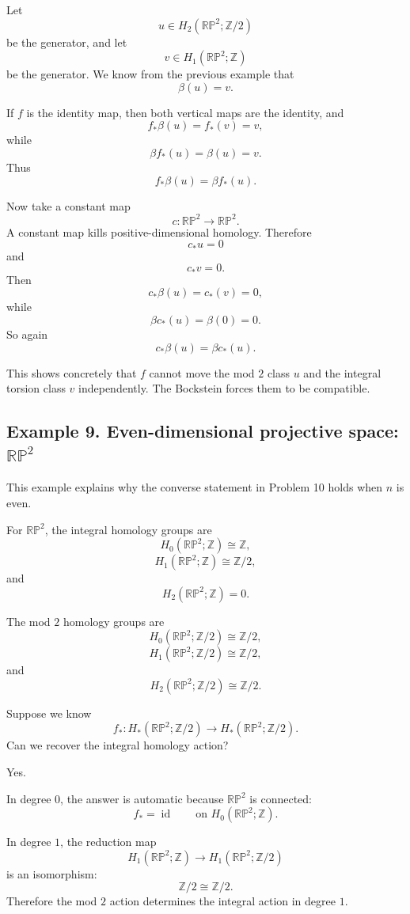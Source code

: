 \documentclass[12pt,a4paper]{article}
\theoremstyle{notespace}
\begin{document}
Let
\[
u\in H_2(\mathbb{RP}^2;\mathbb Z/2)
\]
be the generator, and let
\[
v\in H_1(\mathbb{RP}^2;\mathbb Z)
\]
be the generator. We know from the previous example that
\[
\beta(u)=v.
\]

If \(f\) is the identity map, then both vertical maps are the identity, and
\[
f_*\beta(u)=f_*(v)=v,
\]
while
\[
\beta f_*(u)=\beta(u)=v.
\]
Thus
\[
f_*\beta(u)=\beta f_*(u).
\]

Now take a constant map
\[
c:\mathbb{RP}^2\longrightarrow \mathbb{RP}^2.
\]
A constant map kills positive-dimensional homology. Therefore
\[
c_*u=0
\]
and
\[
c_*v=0.
\]
Then
\[
c_*\beta(u)=c_*(v)=0,
\]
while
\[
\beta c_*(u)=\beta(0)=0.
\]
So again
\[
c_*\beta(u)=\beta c_*(u).
\]

This shows concretely that \(f\) cannot move the mod \(2\) class \(u\) and the integral torsion class \(v\) independently. The Bockstein forces them to be compatible.

\subsection{Example 9. Even-dimensional projective space: \texorpdfstring{\(\mathbb{RP}^2\)}{RP2}}

This example explains why the converse statement in Problem 10 holds when \(n\) is even.

For \(\mathbb{RP}^2\), the integral homology groups are
\[
H_0(\mathbb{RP}^2;\mathbb Z)\cong\mathbb Z,
\]
\[
H_1(\mathbb{RP}^2;\mathbb Z)\cong\mathbb Z/2,
\]
and
\[
H_2(\mathbb{RP}^2;\mathbb Z)=0.
\]

The mod \(2\) homology groups are
\[
H_0(\mathbb{RP}^2;\mathbb Z/2)\cong\mathbb Z/2,
\]
\[
H_1(\mathbb{RP}^2;\mathbb Z/2)\cong\mathbb Z/2,
\]
and
\[
H_2(\mathbb{RP}^2;\mathbb Z/2)\cong\mathbb Z/2.
\]

Suppose we know
\[
f_*:H_*(\mathbb{RP}^2;\mathbb Z/2)
\longrightarrow
H_*(\mathbb{RP}^2;\mathbb Z/2).
\]
Can we recover the integral homology action?

Yes.

In degree \(0\), the answer is automatic because \(\mathbb{RP}^2\) is connected:
\[
f_*=\operatorname{id}
\qquad
\text{on }
H_0(\mathbb{RP}^2;\mathbb Z).
\]

In degree \(1\), the reduction map
\[
H_1(\mathbb{RP}^2;\mathbb Z)
\longrightarrow
H_1(\mathbb{RP}^2;\mathbb Z/2)
\]
is an isomorphism:
\[
\mathbb Z/2\cong \mathbb Z/2.
\]
Therefore the mod \(2\) action determines the integral action in degree \(1\).
\end{document}
